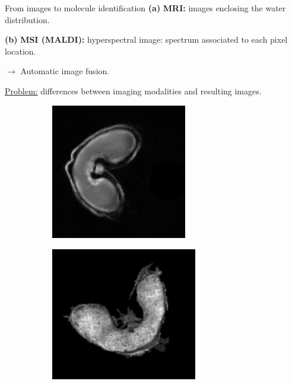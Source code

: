 \documentclass[10pt]{beamer}
\begin{document}
\begin{frame}{From images to molecule identification}
  \textbf{(a)} \textbf{MRI:} images enclosing the water distribution.
   \vspace{0.1cm}

  \textbf{(b)} \textbf{MSI (MALDI):} hyperspectral image: spectrum associated to each pixel location.

  $\rightarrow$ Automatic image \alert{fusion}.

  \underline{Problem:} differences between imaging modalities and resulting images.

  \vspace{-0.2cm}
  \begin{figure}[ht]
    \centering
    \begin{subfigure}[t]{0.4\textwidth}
      \centering \includegraphics[width=0.65\textwidth]{fig/mri_slice11}
      \caption{}
      \label{subfig:mri}
    \end{subfigure}%
    \begin{subfigure}[t]{0.4\textwidth}
      \centering \includegraphics[width=0.7\textwidth]{fig/maldi}
      \caption{}
      \label{subfig:maldi}
    \end{subfigure}%
    \label{fig:irm_vs_maldi}
  \end{figure}
  
\end{frame}
\end{document}
